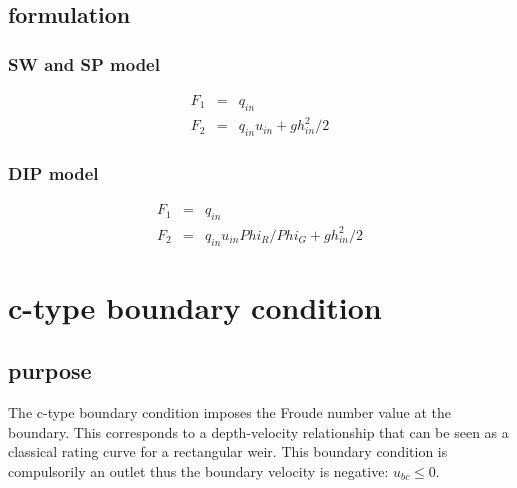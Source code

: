 \subsection{formulation}
\subsubsection{SW and SP model}
\begin{subequations}
\begin{eqnarray}
F_{1} & = & q_{in} \\
F_{2} & = & q_{in} u_{in} + g h_{in} ^ 2 / 2
\end{eqnarray}
\end{subequations}

\subsubsection{DIP model}
\begin{subequations}
\begin{eqnarray}
F_{1} & = & q_{in} \\
F_{2} & = & q_{in} u_{in} Phi_R / Phi_G + g h_{in} ^ 2 / 2
\end{eqnarray}
\end{subequations}

\section{c-type boundary condition}
\subsection{purpose}
The c-type boundary condition imposes the Froude number value at the boundary. This corresponds to a depth-velocity relationship that can be seen as a classical rating curve for a rectangular weir. This boundary condition is compulsorily an outlet thus the boundary velocity is negative: $u_{bc} \leq 0$.

